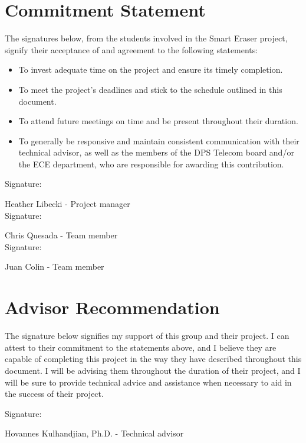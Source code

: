 \documentclass[10pt,onecolumn,draftclsnofoot]{IEEEtran} 					%
\begin{document}
	\section{Commitment Statement}
	\setlength{\parindent}{5ex}
	The signatures below, from the students involved in the Smart Eraser project, signify their acceptance of and agreement to the following statements:
	\begin{itemize}
	\item To invest adequate time on the project and ensure its timely completion.
	\item To meet the project{\rq}s deadlines and stick to the schedule outlined in this document.
	\item To attend future meetings on time and be present throughout their duration.
	\item To generally be responsive and maintain consistent communication with their technical advisor, as well as the members of the DPS Telecom board and/or the ECE department, who are responsible for awarding this contribution.\\ \end{itemize}
	\begin{flushleft}
	Signature: \hrulefill
	
	\hspace*{0mm}\phantom{Approved: }Heather Libecki - Project manager\\
	\vspace{12pt}
	Signature: \hrulefill
	
	\hspace*{0mm}\phantom{Approved: }Chris Quesada - Team member\\
	\vspace{12pt}
	Signature: \hrulefill
	
	\hspace*{0mm}\phantom{Approved: }Juan Colin - Team member\\
	
	\end{flushleft}\par
	\setlength{\parindent}{5ex}
	\section{Advisor Recommendation}
	The signature below signifies my support of this group and their project. I can attest to their commitment to the statements above, and I believe they are capable of completing this project in the way they have described throughout this document. I will be advising them throughout the duration of their project, and I will be sure to provide technical advice and assistance when necessary to aid in the success of their project.\\
	
	\begin{flushleft}
		
	Signature: \hrulefill
	
	\hspace*{0mm}\phantom{Approved: }Hovannes Kulhandjian, Ph.D. - Technical advisor\\\

\end{flushleft}
\end{document}
